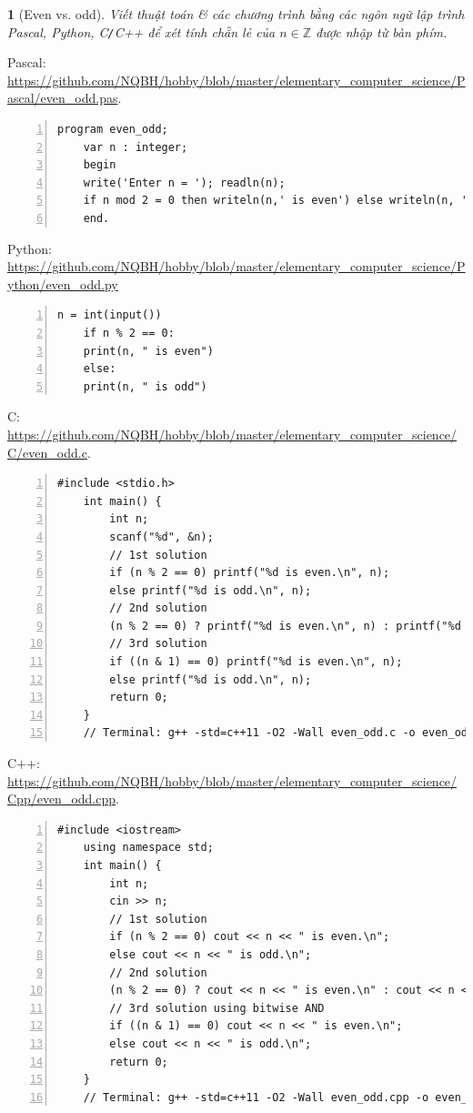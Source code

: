 \documentclass{article}
\newtheorem{baitoan}{}
\begin{document}
\begin{baitoan}[Even vs. odd]
	Viết thuật toán \& các chương trình bằng các ngôn ngữ lập trình {\sf Pascal, Python, C{\tt/}C++} để xét tính chẵn lẻ của $n\in\mathbb{Z}$ được nhập từ bàn phím.
\end{baitoan}
\noindent Pascal: \url{https://github.com/NQBH/hobby/blob/master/elementary_computer_science/Pascal/even_odd.pas}.
\begin{Verbatim}[numbers=left,xleftmargin=5mm]
	program even_odd;
	var n : integer;
	begin
	write('Enter n = '); readln(n);
	if n mod 2 = 0 then writeln(n,' is even') else writeln(n, ' is odd');
	end.
\end{Verbatim}
Python: \url{https://github.com/NQBH/hobby/blob/master/elementary_computer_science/Python/even_odd.py}
\begin{Verbatim}[numbers=left,xleftmargin=5mm]
	n = int(input())
	if n % 2 == 0:
	print(n, " is even")
	else:
	print(n, " is odd")
\end{Verbatim}
C: \url{https://github.com/NQBH/hobby/blob/master/elementary_computer_science/C/even_odd.c}.
\begin{Verbatim}[numbers=left,xleftmargin=5mm]
	#include <stdio.h>
	int main() {
		int n;
		scanf("%d", &n);
		// 1st solution
		if (n % 2 == 0) printf("%d is even.\n", n);
		else printf("%d is odd.\n", n);
		// 2nd solution
		(n % 2 == 0) ? printf("%d is even.\n", n) : printf("%d is odd.\n", n);
		// 3rd solution
		if ((n & 1) == 0) printf("%d is even.\n", n);
		else printf("%d is odd.\n", n);
		return 0;
	}
	// Terminal: g++ -std=c++11 -O2 -Wall even_odd.c -o even_odd
\end{Verbatim}
C++: \url{https://github.com/NQBH/hobby/blob/master/elementary_computer_science/Cpp/even_odd.cpp}.
\begin{Verbatim}[numbers=left,xleftmargin=5mm]
	#include <iostream>
	using namespace std;
	int main() {
		int n;
		cin >> n;
		// 1st solution
		if (n % 2 == 0) cout << n << " is even.\n";
		else cout << n << " is odd.\n";
		// 2nd solution
		(n % 2 == 0) ? cout << n << " is even.\n" : cout << n << " is odd.\n";
		// 3rd solution using bitwise AND
		if ((n & 1) == 0) cout << n << " is even.\n";
		else cout << n << " is odd.\n";
		return 0;
	}
	// Terminal: g++ -std=c++11 -O2 -Wall even_odd.cpp -o even_odd
\end{Verbatim}
\end{document}
